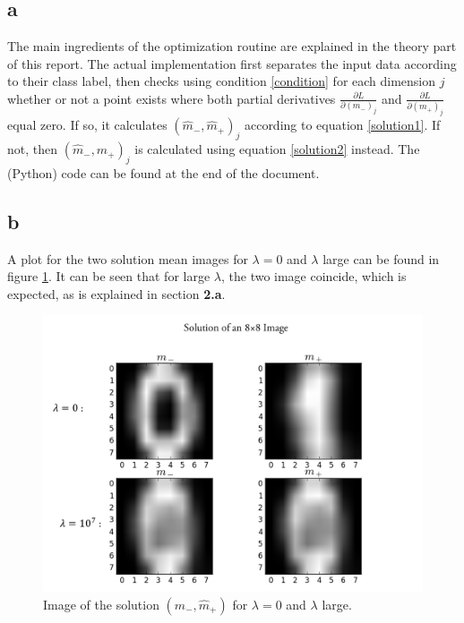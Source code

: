 \documentclass [a4paper] {report}
\begin{document}
	\subsection*{a}
	The main ingredients of the optimization routine are explained in the theory part of this report. The actual implementation first separates the input data according to their class label, then checks using condition \ref{condition} for each dimension $j$ whether or not a point exists where both partial derivatives $\frac{\partial L}{\partial(m_{-})_{j}}$ and $\frac{\partial L}{\partial(m_{+})_{j}}$ equal zero. If so, it calculates $(\hat{m}_{-},\hat{m}_{+})_{j}$ according to equation \ref{solution1}. If not, then $(\hat{m}_{-},\hat{m}_{+})_{j}$ is calculated using equation \ref{solution2} instead. The (Python) code can be found at the end of the document.
	
	\subsection*{b}
	A plot for the two solution mean images for $\lambda=0$ and $\lambda$ large can be found in figure \ref{fig:image}. It can be seen that for large $\lambda$, the two image coincide, which is expected, as is explained in section \textbf{2.a}.
	\begin{figure}[H]
		\includegraphics[width = \textwidth]{Images/figure_1.png}
		\caption{Image of the solution $(\hat{m}_{-},\hat{m}_{+})$ for $\lambda=0$ and $\lambda$ large. }
		\label{fig:image}
	\end{figure}
\end{document}
